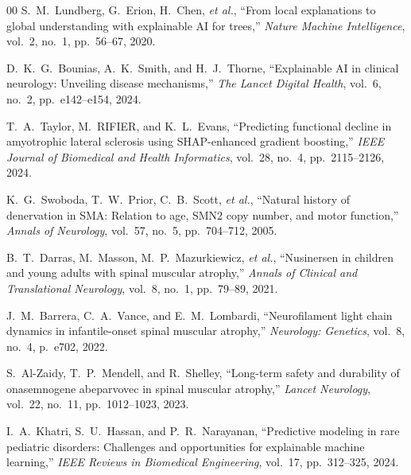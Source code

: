 \documentclass[journal]{IEEEtran}
\begin{document}
\begin{thebibliography}{00}
S.~M.~Lundberg, G.~Erion, H.~Chen, \textit{et al.}, ``From local explanations to global understanding with explainable AI for trees,'' \textit{Nature Machine Intelligence}, vol.~2, no.~1, pp.~56--67, 2020.

D.~K.~G.~Bounias, A.~K.~Smith, and H.~J.~Thorne, ``Explainable AI in clinical neurology: Unveiling disease mechanisms,'' \textit{The Lancet Digital Health}, vol.~6, no.~2, pp.~e142--e154, 2024.

T.~A.~Taylor, M.~RIFIER, and K.~L.~Evans, ``Predicting functional decline in amyotrophic lateral sclerosis using SHAP-enhanced gradient boosting,'' \textit{IEEE Journal of Biomedical and Health Informatics}, vol.~28, no.~4, pp.~2115--2126, 2024.

K.~G.~Swoboda, T.~W.~Prior, C.~B.~Scott, \textit{et al.}, ``Natural history of denervation in SMA: Relation to age, SMN2 copy number, and motor function,'' \textit{Annals of Neurology}, vol.~57, no.~5, pp.~704--712, 2005.

B.~T.~Darras, M.~Masson, M.~P.~Mazurkiewicz, \textit{et al.}, ``Nusinersen in children and young adults with spinal muscular atrophy,'' \textit{Annals of Clinical and Translational Neurology}, vol.~8, no.~1, pp.~79--89, 2021.

J.~M.~Barrera, C.~A.~Vance, and E.~M.~Lombardi, ``Neurofilament light chain dynamics in infantile-onset spinal muscular atrophy,'' \textit{Neurology: Genetics}, vol.~8, no.~4, p.~e702, 2022.

S.~Al-Zaidy, T.~P.~Mendell, and R.~Shelley, ``Long-term safety and durability of onasemnogene abeparvovec in spinal muscular atrophy,'' \textit{Lancet Neurology}, vol.~22, no.~11, pp.~1012--1023, 2023.

I.~A.~Khatri, S.~U.~Hassan, and P.~R.~Narayanan, ``Predictive modeling in rare pediatric disorders: Challenges and opportunities for explainable machine learning,'' \textit{IEEE Reviews in Biomedical Engineering}, vol.~17, pp.~312--325, 2024.

\end{thebibliography}

\clearpage

\end{document}
